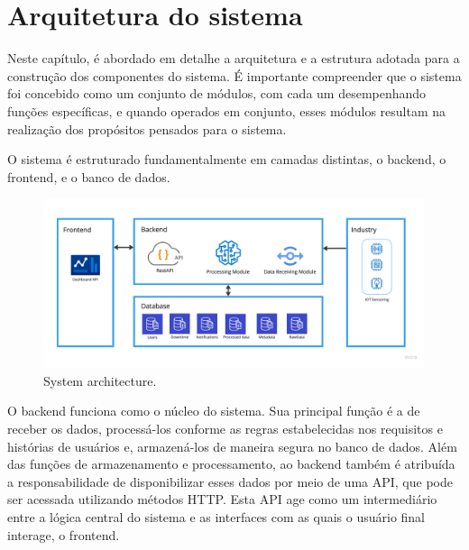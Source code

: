 


\chapter{Arquitetura do sistema}\label{cap:development}
Neste capítulo, é abordado em detalhe a arquitetura e a estrutura adotada para a construção dos componentes do sistema. É importante compreender que o sistema foi concebido como um conjunto de módulos, com cada um desempenhando funções específicas, e quando operados em conjunto, esses módulos resultam na realização dos propósitos pensados para o sistema.

O sistema é estruturado fundamentalmente em camadas distintas, o backend, o frontend, e o banco de dados.

\begin{figure}[htbp]
	\centering
	\includegraphics[width=\textwidth]{images/Architecture.jpg}
	\caption{System architecture.}
	\label{fig:systemAchitectureImage}
\end{figure}

O backend funciona como o núcleo do sistema. Sua principal função é a de receber os dados, processá-los conforme as regras estabelecidas nos requisitos e histórias de usuários e, armazená-los de maneira segura no banco de dados. Além das funções de armazenamento e processamento, ao backend também é atribuída a responsabilidade de disponibilizar esses dados por meio de uma \gls{API}, que pode ser acessada utilizando métodos \gls{HTTP}. Esta \gls{API} age como um intermediário entre a lógica central do sistema e as interfaces com as quais o usuário final interage, o frontend.

